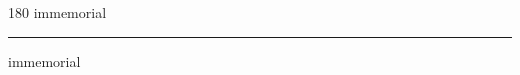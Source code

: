 
\begin{frame}
\begin{center}
\begin{turn}{180}
{\fontsize{2.5cm}{1em}\selectfont immemorial}
\end{turn}
\vspace{1em}\par  
\hrule
\vspace{1em}\par  
{\fontsize{2.5cm}{1em}\selectfont immemorial}
\end{center}
\end{frame}
